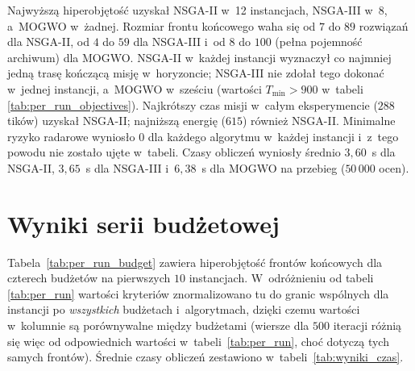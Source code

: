 Najwyższą hiperobjętość uzyskał NSGA-II w~12 instancjach, NSGA-III w~8,
a~MOGWO w~żadnej. Rozmiar frontu końcowego waha się od $7$ do $89$ rozwiązań
dla NSGA-II, od $4$ do $59$ dla NSGA-III i~od $8$ do $100$ (pełna pojemność
archiwum) dla MOGWO. NSGA-II w~każdej instancji wyznaczył co najmniej jedną
trasę kończącą misję w~horyzoncie; NSGA-III nie zdołał tego dokonać w~jednej
instancji, a~MOGWO w~sześciu (wartości $T_{\min} > 900$ w~tabeli
\ref{tab:per_run_objectives}). Najkrótszy czas misji w~całym eksperymencie
($288$ tików) uzyskał NSGA-II; najniższą energię ($615$) również NSGA-II.
Minimalne ryzyko radarowe wyniosło $0$ dla każdego algorytmu w~każdej instancji
i~z~tego powodu nie zostało ujęte w~tabeli. Czasy obliczeń wyniosły średnio
$3{,}60$~s dla NSGA-II, $3{,}65$~s dla NSGA-III i~$6{,}38$~s dla MOGWO na
przebieg ($50\,000$ ocen).

\section{Wyniki serii budżetowej}
\label{sec:wyniki_budzet}

Tabela~\ref{tab:per_run_budget} zawiera hiperobjętość frontów końcowych dla
czterech budżetów na pierwszych $10$ instancjach. W~odróżnieniu od tabeli
\ref{tab:per_run} wartości kryteriów znormalizowano tu do granic wspólnych dla
instancji po \emph{wszystkich} budżetach i~algorytmach, dzięki czemu wartości
w~kolumnie są porównywalne między budżetami (wiersze dla $500$ iteracji różnią
się więc od odpowiednich wartości w~tabeli~\ref{tab:per_run}, choć dotyczą tych
samych frontów). Średnie czasy obliczeń zestawiono w~tabeli~\ref{tab:wyniki_czas}.

